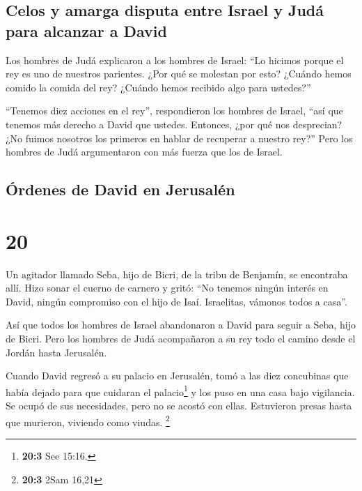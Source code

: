 \hypertarget{celos-y-amarga-disputa-entre-israel-y-juduxe1-para-alcanzar-a-david}{%
\subsection{Celos y amarga disputa entre Israel y Judá para alcanzar a
David}\label{celos-y-amarga-disputa-entre-israel-y-juduxe1-para-alcanzar-a-david}}

 Los hombres de Judá explicaron a los hombres de Israel:
``Lo hicimos porque el rey es uno de nuestros parientes. ¿Por qué se
molestan por esto? ¿Cuándo hemos comido la comida del rey? ¿Cuándo hemos
recibido algo para ustedes?''

 ``Tenemos diez acciones en el rey'', respondieron los
hombres de Israel, ``así que tenemos más derecho a David que ustedes.
Entonces, ¿por qué nos desprecian? ¿No fuimos nosotros los primeros en
hablar de recuperar a nuestro rey?'' Pero los hombres de Judá
argumentaron con más fuerza que los de Israel.

\hypertarget{uxf3rdenes-de-david-en-jerusaluxe9n}{%
\subsection{Órdenes de David en
Jerusalén}\label{uxf3rdenes-de-david-en-jerusaluxe9n}}

\hypertarget{section-19}{%
\section{20}\label{section-19}}

 Un agitador llamado Seba, hijo de Bicri, de la tribu de
Benjamín, se encontraba allí. Hizo sonar el cuerno de carnero y gritó:
``No tenemos ningún interés en David, ningún compromiso con el hijo de
Isaí. Israelitas, vámonos todos a casa''.

 Así que todos los hombres de Israel abandonaron a David
para seguir a Seba, hijo de Bicri. Pero los hombres de Judá acompañaron
a su rey todo el camino desde el Jordán hasta Jerusalén.

 Cuando David regresó a su palacio en Jerusalén, tomó a
las diez concubinas que había dejado para que cuidaran el
palacio\footnote{\textbf{20:3} See 15:16.} y los puso en una casa bajo
vigilancia. Se ocupó de sus necesidades, pero no se acostó con ellas.
Estuvieron presas hasta que murieron, viviendo como viudas. \footnote{\textbf{20:3}
  2Sam 16,21}

